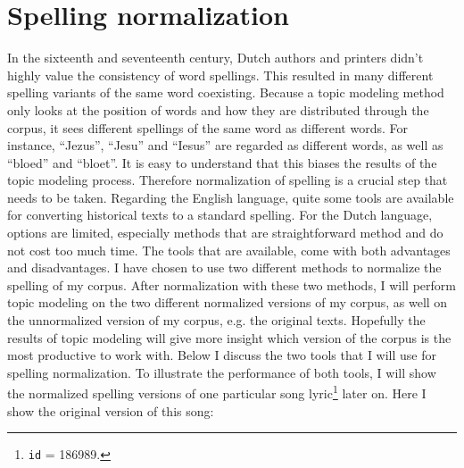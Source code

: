 \chapter{Spelling normalization}
In the sixteenth and seventeenth century, Dutch authors and printers didn't highly value the consistency of word spellings. This resulted in many different spelling variants of the same word coexisting. Because a topic modeling method only looks at the position of words and how they are distributed through the corpus, it sees different spellings of the same word as different words. For instance, \enquote{Jezus}, \enquote{Jesu} and \enquote{Iesus} are regarded as different words, as well as \enquote{bloed} and \enquote{bloet}. It is easy to understand that this biases the results of the topic modeling process. Therefore normalization of spelling is a crucial step that needs to be taken. Regarding the English language, quite some tools are available for converting historical texts to a standard spelling. For the Dutch language, options are limited, especially methods that are straightforward method and do not cost too much time. The tools that are available, come with both advantages and disadvantages. I have chosen to use two different methods to normalize the spelling of my corpus. After normalization with these two methods, I will perform topic modeling on the two different normalized versions of my corpus, as well on the unnormalized version of my corpus, e.g. the original texts. Hopefully the results of topic modeling will give more insight which version of the corpus is the most productive to work with. Below I discuss the two tools that I will use for spelling normalization. To illustrate the performance of both tools, I will show the normalized spelling versions of one particular song lyric\footnote{\texttt{id} = 186989.} later on. Here I show the original version of this song:

